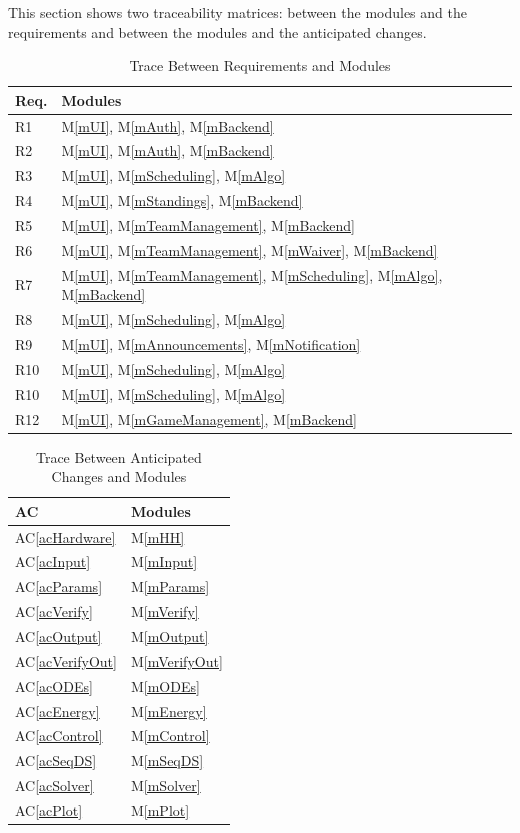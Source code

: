 \documentclass[12pt, titlepage]{article}
\newcommand{\acref}[1]{AC\ref{#1}}
\newcommand{\mref}[1]{M\ref{#1}}
\begin{document}
This section shows two traceability matrices: between the modules and the
requirements and between the modules and the anticipated changes.

\begin{table}[H]
\centering
\begin{tabular}{p{} p{}}
\toprule
\textbf{Req.} & \textbf{Modules}\\
\midrule
R1 & \mref{mUI}, \mref{mAuth}, \mref{mBackend}\\
R2 & \mref{mUI}, \mref{mAuth}, \mref{mBackend}\\
R3 & \mref{mUI}, \mref{mScheduling}, \mref{mAlgo}\\
R4 & \mref{mUI}, \mref{mStandings}, \mref{mBackend}\\
R5 & \mref{mUI}, \mref{mTeamManagement}, \mref{mBackend}\\
R6 & \mref{mUI}, \mref{mTeamManagement}, \mref{mWaiver}, \mref{mBackend}\\
R7 & \mref{mUI}, \mref{mTeamManagement}, \mref{mScheduling}, \mref{mAlgo}, \mref{mBackend}\\
R8 & \mref{mUI}, \mref{mScheduling}, \mref{mAlgo}\\
R9 & \mref{mUI}, \mref{mAnnouncements}, \mref{mNotification}\\
R10 & \mref{mUI}, \mref{mScheduling}, \mref{mAlgo}\\
R10 & \mref{mUI}, \mref{mScheduling}, \mref{mAlgo}\\
R12 & \mref{mUI}, \mref{mGameManagement}, \mref{mBackend}\\

\bottomrule
\end{tabular}
\caption{Trace Between Requirements and Modules}
\label{TblRT}
\end{table}

\begin{table}[H]
\centering
\begin{tabular}{p{} p{}}
\toprule
\textbf{AC} & \textbf{Modules}\\
\midrule
\acref{acHardware} & \mref{mHH}\\
\acref{acInput} & \mref{mInput}\\
\acref{acParams} & \mref{mParams}\\
\acref{acVerify} & \mref{mVerify}\\
\acref{acOutput} & \mref{mOutput}\\
\acref{acVerifyOut} & \mref{mVerifyOut}\\
\acref{acODEs} & \mref{mODEs}\\
\acref{acEnergy} & \mref{mEnergy}\\
\acref{acControl} & \mref{mControl}\\
\acref{acSeqDS} & \mref{mSeqDS}\\
\acref{acSolver} & \mref{mSolver}\\
\acref{acPlot} & \mref{mPlot}\\
\bottomrule
\end{tabular}
\caption{Trace Between Anticipated Changes and Modules}
\label{TblACT}
\end{table}
\end{document}
